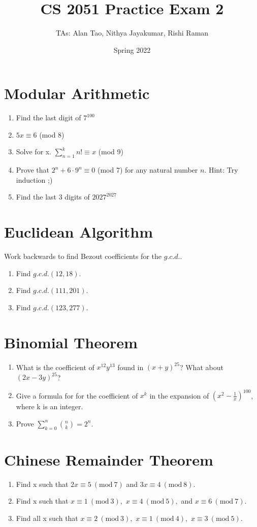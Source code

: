\documentclass{article}
\title{CS 2051 Practice Exam 2}
\author {TAs: Alan Tao, Nithya Jayakumar, Rishi Raman}
\date{Spring 2022}
\newcommand{\Mod}[1]{\ (\mathrm{mod}\ #1)}
\begin{document}
    \maketitle
\section{Modular Arithmetic}

\begin{enumerate}[label=\alph*.]
\item Find the last digit of $7^{100}$
\item $5x \equiv6$ (mod 8)
\item Solve for x. $\sum_{n = 1} ^ {k} n! \equiv x$ (mod 9)
\item Prove that $2^{n} + 6 \cdot 9^{n} \equiv 0 $ (mod 7) for any natural number $n$. Hint: Try induction ;) 
\item Find the last 3 digits of $2027 ^ {2027}$
\end{enumerate}

\section{Euclidean Algorithm}
Work backwards to find Bezout coefficients for the $g.c.d.$.
\begin{enumerate}
    \item Find $g.c.d.(12, 18)$.
    \item Find $g.c.d.(111, 201)$.
    \item Find $g.c.d.(123, 277)$.
\end{enumerate}
\section{Binomial Theorem}
    \begin{enumerate}
        \item What is the coefficient of $x^{12}y^{13}$ found in $(x + y)^{25}$? What about $(2x - 3y)^{25}$?
        \item Give a formula for for the coefficient of $x^k$ in the expansion of $(x^2 - \frac{1}{x})^{100}$, where k
            is an integer.
        \item Prove $\sum _{k = 0}^n \binom{n}{k} = 2^n.$
    \end{enumerate}

\section{Chinese Remainder Theorem}
\begin{enumerate}
    \item Find x such that $2x \equiv 5 \Mod{7}$ and $3x \equiv 4 \Mod{8}.$
    \item Find x such that $x \equiv 1 \Mod{3},$ $x \equiv 4 \Mod{5},$ and $x \equiv 6 \Mod{7}.$
    \item Find all x such that $x \equiv 2 \Mod{3},$ $x \equiv 1 \Mod{4},$ $x \equiv 3 \Mod{5}.$
\end{enumerate}
\end{document}
